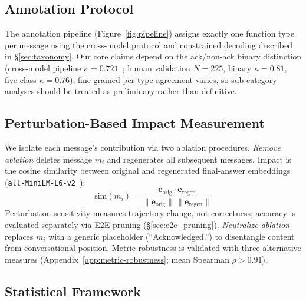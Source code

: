 \subsection{Annotation Protocol}
\label{sec:methodology}
\label{sec:taxonomy_method}

The annotation pipeline (Figure~\ref{fig:pipeline}) assigns exactly one function type per message using the cross-model protocol and constrained decoding described in \S\ref{sec:taxonomy}. Our core claims depend on the ack/non-ack binary distinction (cross-model pipeline $\kappa{=}0.721$~\citep{cohen_1960}; human validation $N = 225$, binary $\kappa = 0.81$, five-class $\kappa = 0.76$); fine-grained per-type agreement varies, so sub-category analyses should be treated as preliminary rather than definitive.

\subsection{Perturbation-Based Impact Measurement}
\label{sec:perturbation}

We isolate each message's contribution via two ablation procedures. \emph{Remove ablation} deletes message $m_i$ and regenerates all subsequent messages. Impact is the cosine similarity between original and regenerated final-answer embeddings (\texttt{all-MiniLM-L6-v2}~\citep{reimers_sentence_bert_2019}):
\begin{equation}
\text{sim}(m_i) = \frac{\mathbf{e}_{\text{orig}} \cdot \mathbf{e}_{\text{regen}}}{\|\mathbf{e}_{\text{orig}}\| \, \|\mathbf{e}_{\text{regen}}\|}
\label{eq:cosine_sim}
\end{equation}
Perturbation sensitivity measures trajectory change, not correctness; accuracy is evaluated separately via E2E pruning (\S\ref{sec:e2e_pruning}). \emph{Neutralize ablation} replaces $m_i$ with a generic placeholder (``Acknowledged.'') to disentangle content from conversational position. Metric robustness is validated with three alternative measures (Appendix~\ref{app:metric-robustness}; mean Spearman $\rho > 0.91$).

\subsection{Statistical Framework}
\label{sec:statistical_framework}

